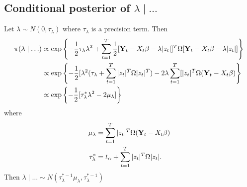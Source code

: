 \subsection*{Conditional posterior of $\lambda \mid \ldots$}\label{s:lambdapost}
Let $\lambda \sim N(0, \tau_\lambda)$ where $\tau_\lambda$ is a precision term. Then
\begin{align*}
  \pi(\lambda \mid \ldots) &\propto \exp \left\{ -\frac{ 1 }{ 2 } \tau_\lambda \lambda^2 + \sum_{ t = 1 }^T \frac{ 1 }{ 2 } [\mbox{\bf Y}_t - X_t\beta - \lambda |z_t|]^T \Omega [\mbox{\bf Y}_t - X_t\beta - \lambda |z_t|] \right\} \\
      &\propto \exp \left\{ -\frac{ 1 }{ 2 } [\lambda^2(\tau_\lambda + \sum_{t = 1 }^T |z_t|^T \Omega |z_t|^T) - 2 \lambda \sum_{t=1}^T[|z_t|^T \Omega (\mbox{\bf Y}_t - X_t \beta) \right\}\\
      &\propto \exp \left\{ -\frac{ 1 }{ 2 } [\tau_\lambda^* \lambda^2 - 2 \mu_\lambda] \right\}
\end{align*}
where
\begin{align*}
  \mu_\lambda &= \sum_{t = 1}^T |z_t|^T \Omega (\mbox{\bf Y}_t - X_t \beta)\\
  \tau_\lambda^* &= t_\alpha + \sum_{t=1}^T |z_t|^T \Omega |z_t|.
\end{align*}
Then $\lambda \mid \ldots \sim N(\tau^{*-1}_\lambda \mu_\lambda, \tau^{*-1}_\lambda) $